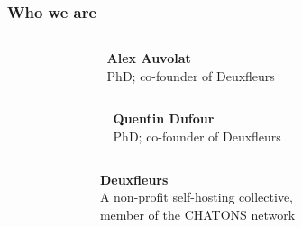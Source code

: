 \documentclass[aspectratio=169]{beamer}
\begin{document}
\begin{frame}
	\frametitle{Who we are}
	\begin{columns}[t]
		\begin{column}{.2\textwidth}
			\centering
		\end{column}
		\begin{column}{.6\textwidth}
			\textbf{Alex Auvolat}\\
			PhD; co-founder of Deuxfleurs
		\end{column}
		\begin{column}{.2\textwidth}
			~
		\end{column}
	\end{columns}
	\vspace{1em}

	\begin{columns}[t]
		\begin{column}{.2\textwidth}
			~
		\end{column}
		\begin{column}{.6\textwidth}
			\textbf{Quentin Dufour}\\
			PhD; co-founder of Deuxfleurs
		\end{column}
		\begin{column}{.2\textwidth}
			\centering
		\end{column}
	\end{columns}
	\vspace{2em}

	\begin{columns}[t]
		\begin{column}{.2\textwidth}
			\centering
		\end{column}
		\begin{column}{.6\textwidth}
			\textbf{Deuxfleurs}\\
			A non-profit self-hosting collective,\\
			member of the CHATONS network
		\end{column}
		\begin{column}{.2\textwidth}
			\centering
		\end{column}
	\end{columns}

\end{frame}
\end{document}
